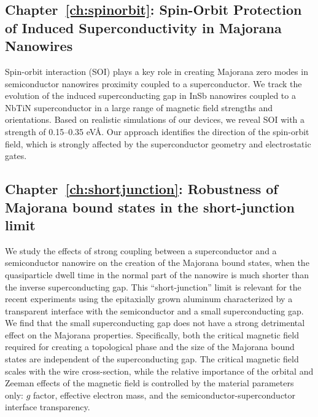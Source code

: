\subsection{Chapter~\ref{ch:spinorbit}: Spin-Orbit Protection of Induced Superconductivity in Majorana Nanowires}
Spin-orbit interaction (SOI) plays a key role in creating Majorana zero modes in semiconductor nanowires proximity coupled to a superconductor.
We track the evolution of the induced superconducting gap in InSb nanowires coupled to a NbTiN superconductor in a large range of magnetic field strengths and orientations.
Based on realistic simulations of our devices, we reveal SOI with a strength of 0.15--0.35 eV\AA.
Our approach identifies the direction of the spin-orbit field, which is strongly affected by the superconductor geometry and electrostatic gates.
\vspace{1mm}

\subsection{Chapter~\ref{ch:shortjunction}: Robustness of Majorana bound states in the short-junction limit}
We study the effects of strong coupling between a superconductor and a semiconductor nanowire on the creation of the Majorana bound states, when the quasiparticle dwell time in the normal part of the nanowire is much shorter than the inverse superconducting gap.
This ``short-junction'' limit is relevant for the recent experiments using the epitaxially grown aluminum characterized by a transparent interface with the semiconductor and a small superconducting gap.
We find that the small superconducting gap does not have a strong detrimental effect on the Majorana properties.
Specifically, both the critical magnetic field required for creating a topological phase and the size of the Majorana bound states are independent of the superconducting gap.
The critical magnetic field scales with the wire cross-section, while the relative importance of the orbital and Zeeman effects of the magnetic field is controlled by the material parameters only: $g$ factor, effective electron mass, and the semiconductor-superconductor interface transparency.


